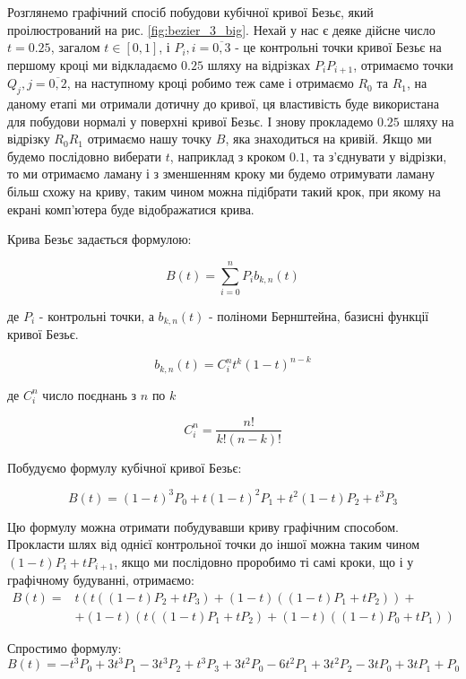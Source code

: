 \documentclass[14pt,a4paper]{extarticle}
\theoremstyle{definition}
\renewcommand{\[}{\begin{singlespace}\begin{equation*}}
\renewcommand{\]}{\end{equation*}\end{singlespace}}
\begin{document}
Розглянемо графічний спосіб побудови кубічної кривої Безьє, який проілюстрований на рис. \ref{fig:bezier_3_big}. Нехай у нас є деяке дійсне число $t=0.25$, загалом $t \in [0,1]$, і $P_i, i=\overline{0,3}$ - це контрольні точки кривої Безьє на першому кроці ми відкладаємо $0.25$ шляху на відрізках $P_iP_{i+1}$, отримаємо точки $Q_{j}, j=\overline{0,2}$, на наступному кроці робимо теж саме і отримаємо $R_0$ та $R_1$, на даному етапі ми отримали дотичну до кривої, ця властивість буде використана для побудови нормалі у поверхні кривої Безьє. І знову прокладемо $0.25$ шляху на відрізку $R_0R_1$ отримаємо нашу точку $B$, яка знаходиться на кривій. Якщо ми будемо послідовно виберати $t$, наприклад з кроком $0.1$, та з'єднувати у відрізки, то ми отримаємо ламану і з зменшенням кроку ми будемо отримувати ламану більш схожу на криву, таким чином можна підібрати такий крок, при якому на екрані комп'ютера буде відображатися крива.

Крива Безьє задається формулою:
\[B(t)=\sum_{i=0}^n P_i b_{k,n}(t)\]
де $P_i$ - контрольні точки, а $b_{k,n}(t)$ - поліноми Бернштейна, базисні функції кривої Безьє.
\[b_{k,n}(t)=C_i^nt^k(1-t)^{n-k}\]
де $C_i^n$ число поєднань з $n$ по $k$
\[C_i^n=\frac{n!}{k!(n-k)!}\]

Побудуємо формулу кубічної кривої Безьє:
\[B(t)=(1-t)^3P_0+t(1-t)^2P_1+t^2(1-t)P_2+t^3P_3\]

Цю формулу можна отримати побудувавши криву графічним способом. Прокласти шлях від однієї контрольної точки до іншої можна таким чином $(1-t)P_i+tP_{i+1}$, якщо ми послідовно проробимо ті самі кроки, що і у графічному будуванні, отримаємо:
\begin{align*}
B(t)=&t (t ((1 - t) P_{2} + t P_{3}) + (1 - t) ((1 - t) P_{1} + t P_{2})) +\\
&+(1 - t) (t ((1 - t) P_{1} + t P_{2}) + (1 - t) ((1 - t) P_{0} + t P_{1}))
\end{align*}

Спростимо формулу:
\begin{equation}
\label{eq:bezier_curve}
B(t) = -t^3P_0+3t^3P_1-3t^3P_2+t^3P_3 + 3t^2P_0-6t^2P_1+3t^2P_2 - 3tP_0+3tP_1 + P_0
\end{equation}
\end{document}

